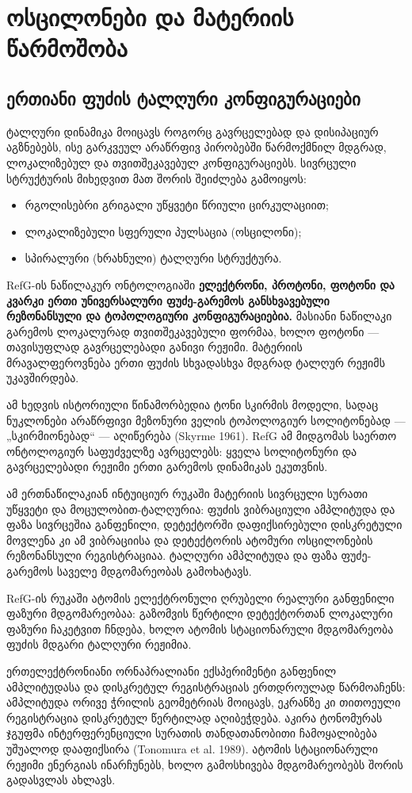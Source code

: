 \documentclass[11pt,a4paper]{article}
\begin{document}
\section{ოსცილონები და მატერიის წარმოშობა}

\subsection{ერთიანი ფუძის ტალღური კონფიგურაციები}

ტალღური დინამიკა მოიცავს როგორც გავრცელებად და დისიპაციურ აგზნებებს, ისე გარკვეულ არაწრფივ პირობებში წარმოქმნილ მდგრად, ლოკალიზებულ და თვითშეკავებულ კონფიგურაციებს. სივრცული სტრუქტურის მიხედვით მათ შორის შეიძლება გამოიყოს:

\begin{itemize}
\item რგოლისებრი გრიგალი უწყვეტი წრიული ცირკულაციით;
\item ლოკალიზებული სფერული პულსაცია (ოსცილონი);
\item სპირალური (ხრახნული) ტალღური სტრუქტურა.

\end{itemize}
RefG-ის ნაწილაკურ ონტოლოგიაში \textbf{ელექტრონი, პროტონი, ფოტონი და კვარკი ერთი უნივერსალური ფუძე-გარემოს განსხვავებული რეზონანსული და ტოპოლოგიური კონფიგურაციებია.} მასიანი ნაწილაკი გარემოს ლოკალურად თვითშეკავებული ფორმაა, ხოლო ფოტონი — თავისუფლად გავრცელებადი განივი რეჟიმი. მატერიის მრავალფეროვნება ერთი ფუძის სხვადასხვა მდგრად ტალღურ რეჟიმს უკავშირდება.

ამ ხედვის ისტორიული წინამორბედია ტონი სკირმის მოდელი, სადაც ნუკლონები არაწრფივი მეზონური ველის ტოპოლოგიურ სოლიტონებად — „სკირმიონებად“ — აღიწერება (Skyrme 1961). RefG ამ მიდგომას საერთო ონტოლოგიურ საფუძველზე ავრცელებს: ყველა სოლიტონური და გავრცელებადი რეჟიმი ერთი გარემოს დინამიკას ეკუთვნის.

ამ ერთნაწილაკიან ინტუიციურ რუკაში მატერიის სივრცული სურათი უწყვეტი და მოცულობით-ტალღურია: ფუძის ვიბრაციული ამპლიტუდა და ფაზა სივრცეშია განფენილი, დეტექტორში დაფიქსირებული დისკრეტული მოვლენა კი ამ ვიბრაციისა და დეტექტორის ატომური ოსცილონების რეზონანსული რეგისტრაციაა. ტალღური ამპლიტუდა და ფაზა ფუძე-გარემოს საველე მდგომარეობას გამოხატავს.

RefG-ის რუკაში ატომის ელექტრონული ღრუბელი რეალური განფენილი ფაზური მდგომარეობაა: გაზომვის წერტილი დეტექტორთან ლოკალური ფაზური ჩაკეტვით ჩნდება, ხოლო ატომის სტაციონარული მდგომარეობა ფუძის მდგარი ტალღური რეჟიმია.

ერთელექტრონიანი ორნაპრალიანი ექსპერიმენტი განფენილ ამპლიტუდასა და დისკრეტულ რეგისტრაციას ერთდროულად წარმოაჩენს: ამპლიტუდა ორივე ჭრილის გეომეტრიას მოიცავს, ეკრანზე კი თითოეული რეგისტრაცია დისკრეტულ წერტილად აღიბეჭდება. აკირა ტონომურას ჯგუფმა ინტერფერენციული სურათის თანდათანობითი ჩამოყალიბება უშუალოდ დააფიქსირა (Tonomura et al. 1989). ატომის სტაციონარული რეჟიმი ენერგიას ინარჩუნებს, ხოლო გამოსხივება მდგომარეობებს შორის გადასვლას ახლავს.
\end{document}
